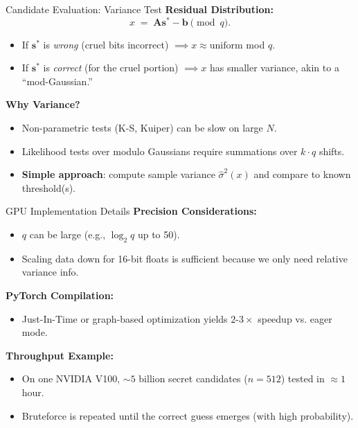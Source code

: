\documentclass{beamer}
\begin{document}
\begin{frame}{Candidate Evaluation: Variance Test}
  \textbf{Residual Distribution:}
  \[
    x \;=\; \mathbf{A}\mathbf{s}^* - \mathbf{b} \pmod{q}.
  \]
  \begin{itemize}
    \item If $\mathbf{s}^*$ is \emph{wrong} (cruel bits incorrect) $\implies x \approx \text{uniform}$ mod $q$.
    \item If $\mathbf{s}^*$ is \emph{correct} (for the cruel portion) $\implies x$ has smaller variance, akin to a ``mod-Gaussian.''
  \end{itemize}

  \vspace{0.3cm}
  \textbf{Why Variance?}
  \begin{itemize}
    \item Non-parametric tests (K-S, Kuiper) can be slow on large $N$.
    \item Likelihood tests over modulo Gaussians require summations over $k\cdot q$ shifts.
    \item \textbf{Simple approach}: compute sample variance $\hat{\sigma}^2(x)$ and compare to known threshold(s).
  \end{itemize}
\end{frame}

\begin{frame}{GPU Implementation Details}
  \textbf{Precision Considerations:}
  \begin{itemize}
    \item $q$ can be large (e.g., $\log_2 q$ up to 50).
    \item Scaling data down for 16-bit floats is sufficient because we only need relative variance info.
  \end{itemize}

  \vspace{0.3cm}
  \textbf{PyTorch Compilation:}
  \begin{itemize}
    \item Just-In-Time or graph-based optimization yields $2\text{-}3\times$ speedup vs. eager mode.
  \end{itemize}

  \vspace{0.3cm}
  \textbf{Throughput Example:}
  \begin{itemize}
    \item On one NVIDIA V100, $\sim5$ billion secret candidates ($n=512$) tested in $\approx1$ hour.
    \item Bruteforce is repeated until the correct guess emerges (with high probability).
  \end{itemize}
\end{frame}
\end{document}
